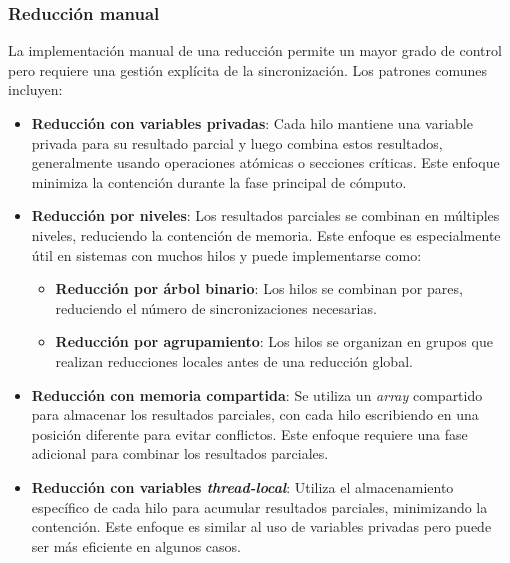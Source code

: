         \subsubsection{Reducción manual}

            La implementación manual de una reducción permite un mayor grado de control pero requiere una gestión explícita de la sincronización. Los patrones comunes incluyen:
            
            \begin{itemize}
            
                \item \textbf{Reducción con variables privadas}: Cada hilo mantiene una variable privada para su resultado parcial y luego combina estos resultados, generalmente usando operaciones atómicas o secciones críticas. Este enfoque minimiza la contención durante la fase principal de cómputo.
                
                \item \textbf{Reducción por niveles}: Los resultados parciales se combinan en múltiples niveles, reduciendo la contención de memoria. Este enfoque es especialmente útil en sistemas con muchos hilos y puede implementarse como:
        
                    \begin{itemize}
                    
                        \item \textbf{Reducción por árbol binario}: Los hilos se combinan por pares, reduciendo el número de sincronizaciones necesarias.
                        
                        \item \textbf{Reducción por agrupamiento}: Los hilos se organizan en grupos que realizan reducciones locales antes de una reducción global.

                    \end{itemize}
        
                \item \textbf{Reducción con memoria compartida}: Se utiliza un \textit{array} compartido para almacenar los resultados parciales, con cada hilo escribiendo en una posición diferente para evitar conflictos. Este enfoque requiere una fase adicional para combinar los resultados parciales.
                
                \item \textbf{Reducción con variables \textit{thread-local}}: Utiliza el almacenamiento específico de cada hilo para acumular resultados parciales, minimizando la contención. Este enfoque es similar al uso de variables privadas pero puede ser más eficiente en algunos casos.
        
            \end{itemize}
        
